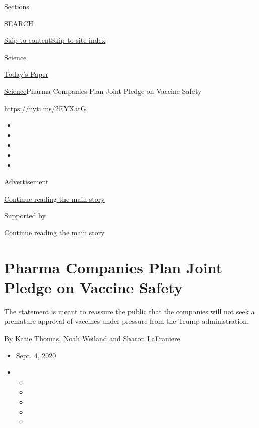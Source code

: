 Sections

SEARCH

\protect\hyperlink{site-content}{Skip to
content}\protect\hyperlink{site-index}{Skip to site index}

\href{https://www.nytimes3xbfgragh.onion/section/science}{Science}

\href{https://myaccount.nytimes3xbfgragh.onion/auth/login?response_type=cookie\&client_id=vi}{}

\href{https://www.nytimes3xbfgragh.onion/section/todayspaper}{Today's
Paper}

\href{/section/science}{Science}\textbar{}Pharma Companies Plan Joint
Pledge on Vaccine Safety

\url{https://nyti.ms/2EYXatG}

\begin{itemize}
\item
\item
\item
\item
\item
\end{itemize}

Advertisement

\protect\hyperlink{after-top}{Continue reading the main story}

Supported by

\protect\hyperlink{after-sponsor}{Continue reading the main story}

\hypertarget{pharma-companies-plan-joint-pledge-on-vaccine-safety}{%
\section{Pharma Companies Plan Joint Pledge on Vaccine
Safety}\label{pharma-companies-plan-joint-pledge-on-vaccine-safety}}

The statement is meant to reassure the public that the companies will
not seek a premature approval of vaccines under pressure from the Trump
administration.

By \href{https://www.nytimes3xbfgragh.onion/by/katie-thomas}{Katie
Thomas}, \href{https://www.nytimes3xbfgragh.onion/by/noah-weiland}{Noah
Weiland} and
\href{https://www.nytimes3xbfgragh.onion/by/sharon-lafraniere}{Sharon
LaFraniere}

\begin{itemize}
\item
  Sept. 4, 2020
\item
  \begin{itemize}
  \item
  \item
  \item
  \item
  \item
  \end{itemize}
\end{itemize}


